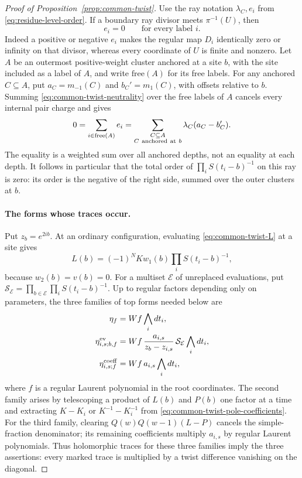 \begin{proof}[Proof of Proposition~\ref{prop:common-twist}]
Use the ray notation $\lambda_C,e_i$ from
\eqref{eq:residue-level-order}. If a boundary ray divisor meets
$\pi^{-1}(U)$, then
\begin{equation}\label{eq:common-twist-neutrality}
 e_i=0\qquad\text{for every label }i.
\end{equation}
Indeed a positive or negative $e_i$ makes the regular map $D_i$
identically zero or infinity on that divisor, whereas every coordinate
of $U$ is finite and nonzero. Let $A$ be an outermost positive-weight
cluster anchored at a site $b$, with the site included as a label of
$A$, and write $\mathrm{free}(A)$ for its free labels. For any anchored $C\subseteq A$, put
$a_C=m_{-1}(C)$ and $b_C'=m_1(C)$, with offsets relative to $b$.
Summing \eqref{eq:common-twist-neutrality} over the free labels of $A$
cancels every internal pair charge and gives
\begin{equation}\label{eq:common-twist-outer-neutrality}
 0=\sum_{i\in\mathrm{free}(A)}e_i
   =\sum_{\substack{C\subseteq A\\ C\ {\rm anchored\ at}\ b}}
        \lambda_C(a_C-b_C').
\end{equation}
The equality is a weighted sum over all anchored depths, not an
equality at each depth. It follows in particular that the total order
of $\prod_i S(t_i-b)^{-1}$ on this ray is zero: its order is the
negative of the right side, summed over the outer clusters at $b$.

\paragraph{The forms whose traces occur.}
Put $z_b=e^{2ib}$. At an ordinary configuration, evaluating
\eqref{eq:common-twist-L} at a site gives
\[
 L(b)=(-1)^N K w_1(b)\prod_i S(t_i-b)^{-1},
\]
because $w_2(b)=v(b)=0$. For a multiset $\mathcal E$ of unreplaced
evaluations, put
$\mathcal S_{\mathcal E}=\prod_{b\in\mathcal E}\prod_iS(t_i-b)^{-1}$.
Up to regular factors depending only on parameters, the three families
of top forms needed below are
\begin{align*}
 \eta_f&=Wf\bigwedge_i dt_i,\\
 \eta^{\rm ev}_{i,s;b,f}
   &=Wf\,\frac{a_{i,s}}{z_b-z_{i,s}}\,
          \mathcal S_{\mathcal E}\bigwedge_i dt_i,\\
 \eta^{\rm coeff}_{i,s;f}
   &=Wf\,a_{i,s}\bigwedge_i dt_i ,
\end{align*}
where $f$ is a regular Laurent polynomial in the root coordinates.
The second family arises by telescoping a product of $L(b)$ and $P(b)$
one factor at a time and extracting $K-K_i$ or
$K^{-1}-K_i^{-1}$ from
\eqref{eq:common-twist-pole-coefficients}. For the third family,
clearing $Q(w)Q(w-1)(L-P)$ cancels the simple-fraction denominator;
its remaining coefficients multiply $a_{i,s}$ by regular Laurent
polynomials. Thus holomorphic traces for these three families imply
the three assertions: every marked trace is multiplied by a twist
difference vanishing on the diagonal.


\end{proof}
